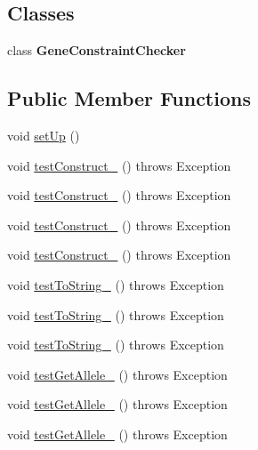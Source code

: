 \subsection*{Classes}
\begin{DoxyCompactItemize}
\item 
class {\bfseries Gene\-Constraint\-Checker}
\end{DoxyCompactItemize}
\subsection*{Public Member Functions}
\begin{DoxyCompactItemize}
\item 
void \hyperlink{classorg_1_1jgap_1_1impl_1_1_double_gene_test_acf21640b05017f218cb68ec92e1f366a}{set\-Up} ()
\item 
void \hyperlink{classorg_1_1jgap_1_1impl_1_1_double_gene_test_ac77e452f5f8368ec47153bbda6373608}{test\-Construct\-\_} ()  throws Exception 
\item 
void \hyperlink{classorg_1_1jgap_1_1impl_1_1_double_gene_test_aeccaf44867e4440eebded7db2005544c}{test\-Construct\-\_} ()  throws Exception 
\item 
void \hyperlink{classorg_1_1jgap_1_1impl_1_1_double_gene_test_abcfe0a6e8ff8569464dd7ee4e48c0839}{test\-Construct\-\_} ()  throws Exception 
\item 
void \hyperlink{classorg_1_1jgap_1_1impl_1_1_double_gene_test_a46c973ee1b70a53cbee2d92792257e8d}{test\-Construct\-\_} ()  throws Exception 
\item 
void \hyperlink{classorg_1_1jgap_1_1impl_1_1_double_gene_test_adb092c0b47ab095cc1295a7a955c87e7}{test\-To\-String\-\_} ()  throws Exception 
\item 
void \hyperlink{classorg_1_1jgap_1_1impl_1_1_double_gene_test_a7406aef41e8fac5c7167199920fdf499}{test\-To\-String\-\_} ()  throws Exception 
\item 
void \hyperlink{classorg_1_1jgap_1_1impl_1_1_double_gene_test_ab329ef8b0ed1bb0e2c1d313717cf8e66}{test\-To\-String\-\_} ()  throws Exception 
\item 
void \hyperlink{classorg_1_1jgap_1_1impl_1_1_double_gene_test_a7071bbd501b8e8b2221d91277cc16ff7}{test\-Get\-Allele\-\_} ()  throws Exception 
\item 
void \hyperlink{classorg_1_1jgap_1_1impl_1_1_double_gene_test_ab339d237a79809954950f37d49fde33f}{test\-Get\-Allele\-\_} ()  throws Exception 
\item 
void \hyperlink{classorg_1_1jgap_1_1impl_1_1_double_gene_test_a636d5d5e8e4e71ff9f65e60f35ef7d50}{test\-Get\-Allele\-\_} ()  throws Exception 

\end{DoxyCompactItemize}
